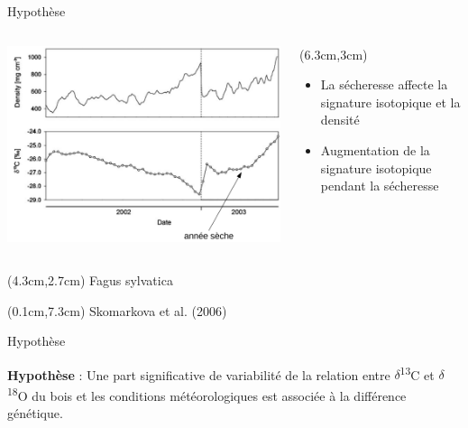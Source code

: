 \documentclass{beamer}
\begin{document}
\begin{frame}{Hypothèse}
	\begin{columns}			
		\begin{column}{0.47\textwidth}
			\includegraphics[width=\textwidth]{CtreizeSkomarkova2006}\\
		\end{column}
		\begin{column}{0.4\textwidth}
			\begin{textblock*}{6cm}(6.3cm,3cm)
				\begin{itemize} 
					\item La sécheresse affecte la signature isotopique et la densité\\
					\vspace{0.2cm}
					\item Augmentation de la signature isotopique pendant la sécheresse\\
	     	\end{itemize}
			\end{textblock*}		
		\end{column}
		
	\end{columns}
	\begin{textblock*}{8cm}(4.3cm,2.7cm)
		\tiny Fagus sylvatica
	\end{textblock*}
	\begin{textblock*}{8cm}(0.1cm,7.3cm)
		\tiny Skomarkova et al. (2006)
	\end{textblock*}
\end{frame}

\begin{frame}{Hypothèse}
	
\Large	\textbf{Hypothèse} : Une part significative de variabilité de la relation entre $\delta$\textsuperscript{13}C et $\delta$\textsuperscript{18}O du bois et les conditions météorologiques est associée à la différence génétique.
	
\end{frame}
\end{document}
